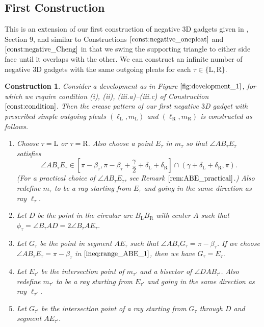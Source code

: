 \documentclass[11pt]{amsart}
\newtheorem{construction}[theorem]{Construction}
\numberwithin{equation}{section}
\numberwithin{theorem}{section}
\newcommand{\Lt}{\ensuremath{\mathrm{L}}}
\newcommand{\Rt}{\ensuremath{\mathrm{R}}}
\begin{document}
\subsection{First Construction}\label{subsec:negative_new_1}
This is an extension of our first construction of negative $3$D gadgets given in \cite{Doi19}, Section $9$, and
similar to Constructions $\ref{const:negative_onepleat}$ and $\ref{const:negative_Cheng}$ in that
we swing the supporting triangle to either side face until it overlaps with the other.
We can construct an infinite number of negative $3$D gadgets with the same outgoing pleats for each $\tau\in\{\Lt ,\Rt\}$.
\begin{construction}\label{const:negative_1}\rm
Consider a development as in Figure $\ref{fig:development_1}$, for which we require condition (i), (ii), (iii.a)--(iii.c) of Construction $\ref{const:condition}$.
Then the crease pattern of our first negative $3$D gadget with prescribed simple outgoing pleats $(\ell_\Lt ,m_\Lt )$ and $(\ell_\Rt ,m_\Rt )$
is constructed as follows.
\begin{enumerate}[(1)]
\item Choose $\tau =\Lt$ or $\tau =\Rt$.
Also choose a point $E_\tau$ in $m_\tau$ so that $\angle AB_\tau E_\tau$ satisfies
\begin{equation}\label{ineq:range_ABE_1}
\angle AB_\tau E_\tau\in\left[\pi -\beta_\tau ,\pi -\beta_\tau +\frac{\gamma}{2}+\delta_\Lt +\delta_\Rt\right]\cap (\gamma +\delta_\Lt +\delta_\Rt ,\pi ).
\end{equation}
(For a practical choice of $\angle AB_\tau E_\tau$, see Remark $\ref{rem:ABE_practical}$.)
Also redefine $m_\tau$ to be a ray starting from $E_\tau$ and going in the same direction as ray $\ell_\tau$.
\item Let $D$ be the point in the circular arc $B_\Lt B_\Rt$ with center $A$ such that $\phi_\tau =\angle B_\tau AD=2\angle B_\tau AE_\tau$.
\item Let $G_\tau$ be the point in segment $AE_\tau$ such that $\angle AB_\tau G_\tau =\pi -\beta_\tau$.
If we choose $\angle AB_\tau E_\tau =\pi -\beta_\tau$ in $\eqref{ineq:range_ABE_1}$, then we have $G_\tau =E_\tau$.
\item Let $E_{\tau'}$ be the intersection point of $m_{\tau'}$ and a bisector of $\angle DAB_{\tau'}$.
Also redefine $m_{\tau'}$ to be a ray starting from $E_{\tau'}$ and going in the same direction as ray $\ell_{\tau'}$.
\item Let $G_{\tau'}$ be the intersection point of a ray starting from $G_\tau$ through $D$ and segment $AE_{\tau'}$.

\end{enumerate}
\end{construction}
\end{document}
